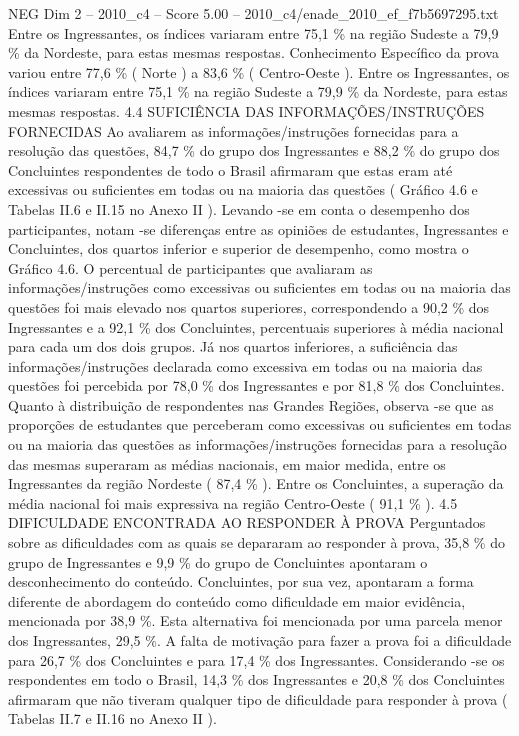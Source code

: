 \begin{textsample}{NEG Dim 2 – 2010\_c4 – Score 5.00 – 2010\_c4/enade\_2010\_ef\_f7b5697295.txt}
Entre os Ingressantes, os índices variaram entre 75,1 \% na região Sudeste a 79,9 \% da Nordeste, para estas mesmas respostas.
Conhecimento Específico da prova variou entre 77,6 \% ( Norte ) a 83,6 \% ( Centro-Oeste ).
Entre os Ingressantes, os índices variaram entre 75,1 \% na região Sudeste a 79,9 \% da Nordeste, para estas mesmas respostas. 4.4 SUFICIÊNCIA DAS INFORMAÇÕES/INSTRUÇÕES FORNECIDAS Ao avaliarem as informações/instruções fornecidas para a resolução das questões, 84,7 \% do grupo dos Ingressantes e 88,2 \% do grupo dos Concluintes respondentes de todo o Brasil afirmaram que estas eram até excessivas ou suficientes em todas ou na maioria das questões ( Gráfico 4.6 e Tabelas II.6 e II.15 no Anexo II ).
Levando -se em conta o desempenho dos participantes, notam -se diferenças entre as opiniões de estudantes, Ingressantes e Concluintes, dos quartos inferior e superior de desempenho, como mostra o Gráfico 4.6.
O percentual de participantes que avaliaram as informações/instruções como excessivas ou suficientes em todas ou na maioria das questões foi mais elevado nos quartos superiores, correspondendo a 90,2 \% dos Ingressantes e a 92,1 \% dos Concluintes, percentuais superiores à média nacional para cada um dos dois grupos.
Já nos quartos inferiores, a suficiência das informações/instruções declarada como excessiva em todas ou na maioria das questões foi percebida por 78,0 \% dos Ingressantes e por 81,8 \% dos Concluintes.
Quanto à distribuição de respondentes nas Grandes Regiões, observa -se que as proporções de estudantes que perceberam como excessivas ou suficientes em todas ou na maioria das questões as informações/instruções fornecidas para a resolução das mesmas superaram as médias nacionais, em maior medida, entre os Ingressantes da região Nordeste ( 87,4 \% ).
Entre os Concluintes, a superação da média nacional foi mais expressiva na região Centro-Oeste ( 91,1 \% ). 4.5 DIFICULDADE ENCONTRADA AO RESPONDER À PROVA Perguntados sobre as dificuldades com as quais se depararam ao responder à prova, 35,8 \% do grupo de Ingressantes e 9,9 \% do grupo de Concluintes apontaram o desconhecimento do conteúdo.
Concluintes, por sua vez, apontaram a forma diferente de abordagem do conteúdo como dificuldade em maior evidência, mencionada por 38,9 \%.
Esta alternativa foi mencionada por uma parcela menor dos Ingressantes, 29,5 \%.
A falta de motivação para fazer a prova foi a dificuldade para 26,7 \% dos Concluintes e para 17,4 \% dos Ingressantes.
Considerando -se os respondentes em todo o Brasil, 14,3 \% dos Ingressantes e 20,8 \% dos Concluintes afirmaram que não tiveram qualquer tipo de dificuldade para responder à prova ( Tabelas II.7 e II.16 no Anexo II ).

\end{textsample}
